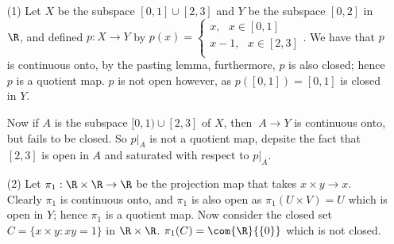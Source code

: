 \begin{example}
    \begin{enumerate}
        \item[(1)] Let $X$ be the subspace  $[0,1] \cup [2,3]$ and $Y$ be the subspace  $[0,2]$ in $\R$,
            and defined  $p:X \rightarrow Y$ by  $p(x)=\begin{cases}
                                                x, \text{ } x \in [0,1] \\
                                                x-1, \text{ } x \in [2,3] \\
                                            \end{cases}$.
        We have that $p$ is continuous onto, by the pasting lemma, furthermore,  $p$ is also closed;
        hence  $p$ is a quotient map.  $p$ is not open however, as  $p([0,1])=[0,1]$ is closed in
        $Y$.

        Now if  $A$ is the subspace  $[0,1) \cup [2,3]$ of $X$, then  $\:A \rightarrow Y$ is
        continuous onto, but fails to be closed. So  $p|_A$ is not a quotient map, depsite the fact
        that  $[2,3]$ is open in $A$ and saturated with respect to  $p|_A$.

        \item[(2)] Let $\pi_1:\R \times \R \rightarrow \R$ be the projection map that takes $x \times y
            \rightarrow x$. Clearly  $\pi_1$ is continuous onto, and $\pi_1$ is also open as
            $\pi_1(U \times V)=U$ which is open in $Y$; hence  $\pi_1$ is a quotient map. Now
            consider the closed set $C=\{x \times y:xy=1\}$ in $\R \times \R$.
            $\pi_1(C)=\com{\R}{\{0\}}$ which is not closed.
    \end{enumerate}
\end{example}

